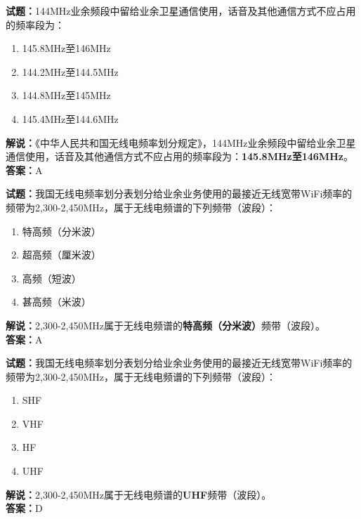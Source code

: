 \documentclass{ctexbook}
\begin{document}
\bigskip




\noindent\textbf{试题：}144\unit{\MHz}业余频段中留给业余卫星通信使用，话音及其他通信方式不应占用的频率段为：
\begin{enumerate}[leftmargin=3em]
\item 145.8\unit{\MHz}至146\unit{\MHz}
\item 144.2\unit{\MHz}至144.5\unit{\MHz}
\item 144.8\unit{\MHz}至145\unit{\MHz}
\item 145.4\unit{\MHz}至144.6\unit{\MHz}
\end{enumerate}
\noindent\textbf{解说：}《中华人民共和国无线电频率划分规定》，144\unit{\MHz}业余频段中留给业余卫星通信使用，话音及其他通信方式不应占用的频率段为：\textbf{145.8\unit{\MHz}至146\unit{\MHz}}。\\\noindent\textbf{答案：}A

\bigskip




\noindent\textbf{试题：}我国无线电频率划分表划分给业余业务使用的最接近无线宽带WiFi频率的频带为2,300-2,450\unit{\MHz}，属于无线电频谱的下列频带（波段）：
\begin{enumerate}[leftmargin=3em]
\item 特高频（分米波）
\item 超高频（厘米波）
\item 高频（短波）
\item 甚高频（米波）
\end{enumerate}
\noindent\textbf{解说：}2,300-2,450\unit{\MHz}属于无线电频谱的\textbf{特高频（分米波）}频带（波段）。\\\noindent\textbf{答案：}A

\bigskip




\noindent\textbf{试题：}我国无线电频率划分表划分给业余业务使用的最接近无线宽带WiFi频率的频带为2,300-2,450\unit{\MHz}，属于无线电频谱的下列频带（波段）：
\begin{enumerate}[leftmargin=3em]
\item SHF
\item VHF
\item HF
\item UHF
\end{enumerate}
\noindent\textbf{解说：}2,300-2,450\unit{\MHz}属于无线电频谱的\textbf{UHF}频带（波段）。\\\noindent\textbf{答案：}D

\bigskip
\end{document}

